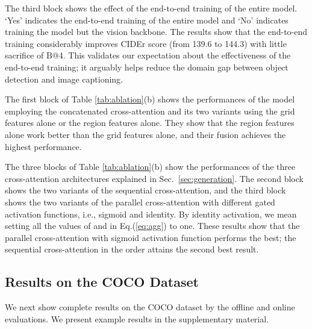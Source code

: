 \documentclass[runningheads]{llncs}
\begin{document}
The third block shows the effect of the end-to-end training of the entire model. `Yes' indicates the end-to-end training of the entire model and `No' indicates training the model but the vision backbone. The results show that
the end-to-end training considerably improves CIDEr score (from 139.6 to 144.3) with little sacrifice of B@4. This validates our expectation about the effectiveness of the end-to-end training; it arguably helps reduce the domain gap between object detection and image captioning. 

The first block of Table \ref{tab:ablation}(b) shows the performances of the model employing the concatenated cross-attention and its two variants using the grid features alone or the region features alone. They show that the region features alone work better than the grid features alone, and their fusion achieves the highest performance.  

The three blocks of Table \ref{tab:ablation}(b) show the performances of the three cross-attention architectures explained in Sec.~\ref{sec:generation}. The second block shows the two variants of the sequential cross-attention, and the third block shows the two variants of the parallel cross-attention with different gated activation functions, i.e., sigmoid and identity. By identity activation, we mean setting all the values of  and  in Eq.(\ref{eq:agg}) to one. These results show that the parallel cross-attention with sigmoid activation function performs the best; the sequential cross-attention in the order  attains the second best result. 

\subsection{Results on the COCO Dataset}
We next show complete results on the COCO dataset by the offline and online evaluations. We present example results in the supplementary material.
\end{document}
